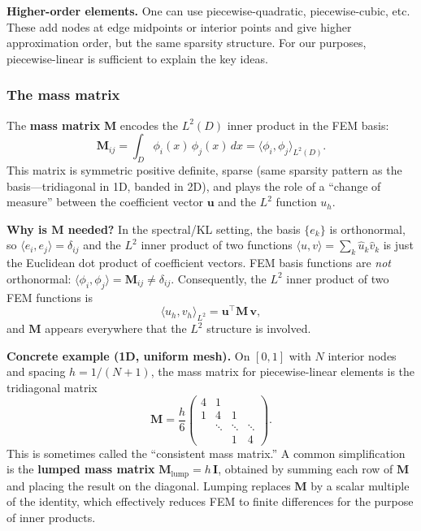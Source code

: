 \documentclass[11pt]{article}
\newcommand{\bM}{\mathbf{M}}
\newcommand{\bu}{\mathbf{u}}
\begin{document}
\medskip\noindent\textbf{Higher-order elements.}  One can use piecewise-quadratic, piecewise-cubic, etc.  These add nodes at edge midpoints or interior points and give higher approximation order, but the same sparsity structure.  For our purposes, piecewise-linear is sufficient to explain the key ideas.

\subsubsection{The mass matrix}\label{sec:mass}

The \textbf{mass matrix} $\bM$ encodes the $L^2(D)$ inner product in the FEM basis:
\begin{equation}\label{eq:mass}
  \bM_{ij} = \int_D \phi_i(x)\, \phi_j(x)\, dx = \langle \phi_i, \phi_j \rangle_{L^2(D)}.
\end{equation}
This matrix is symmetric positive definite, sparse (same sparsity pattern as the basis---tridiagonal in 1D, banded in 2D), and plays the role of a ``change of measure'' between the coefficient vector $\bu$ and the $L^2$ function $u_h$.

\medskip\noindent\textbf{Why is $\bM$ needed?}  In the spectral/KL setting, the basis $\{e_k\}$ is orthonormal, so $\langle e_i, e_j \rangle = \delta_{ij}$ and the $L^2$ inner product of two functions $\langle u, v \rangle = \sum_k \hat{u}_k \hat{v}_k$ is just the Euclidean dot product of coefficient vectors.  FEM basis functions are \emph{not} orthonormal: $\langle \phi_i, \phi_j \rangle = \bM_{ij} \neq \delta_{ij}$.  Consequently, the $L^2$ inner product of two FEM functions is
\[
  \langle u_h, v_h \rangle_{L^2} = \bu^\top \bM\, \mathbf{v},
\]
and $\bM$ appears everywhere that the $L^2$ structure is involved.

\medskip\noindent\textbf{Concrete example (1D, uniform mesh).}  On $[0,1]$ with $N$ interior nodes and spacing $h = 1/(N+1)$, the mass matrix for piecewise-linear elements is the tridiagonal matrix
\[
  \bM = \frac{h}{6}\begin{pmatrix}
  4 & 1 & & \\
  1 & 4 & 1 & \\
    & \ddots & \ddots & \ddots \\
    & & 1 & 4
  \end{pmatrix}.
\]
This is sometimes called the ``consistent mass matrix.''  A common simplification is the \textbf{lumped mass matrix} $\bM_{\text{lump}} = h\, \mathbf{I}$, obtained by summing each row of $\bM$ and placing the result on the diagonal.  Lumping replaces $\bM$ by a scalar multiple of the identity, which effectively reduces FEM to finite differences for the purpose of inner products.
\end{document}
